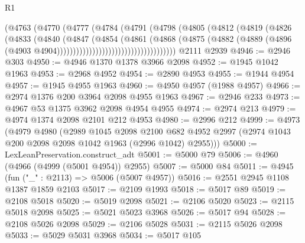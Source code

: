 \begin{lexlean}{R1}
\begin{coremodule}
                                    (@4763
                                      (@4770
                                        (@4777
                                          (@4784
                                            (@4791
                                              (@4798
                                                (@4805
                                                  (@4812
                                                    (@4819
                                                      (@4826
                                                        (@4833
                                                          (@4840
                                                            (@4847
                                                              (@4854
                                                                (@4861
                                                                  (@4868
                                                                    (@4875
                                                                      (@4882
                                                                        (@4889
                                                                          (@4896
                                                                            (@4903
                                                                              @4904)))))))))))))))))))))))))))))))))))))
    @2111
    @2939
@4946 := @2946 @303
@4950 := @4946 @1370 @1378 @3966 @2098
@4952 := @1945 @1042 @1963
@4953 := @2968 @4952
@4954 := @2890 @4953
@4955 := @1944 @4954
@4957 := @1945 @4955 @1963
@4960 := @4950 @4957 (@1988 @4957)
@4966 := @2974 @1376 @200 @3964 @2098 @4955 @1963
@4967 := @2946 @233
@4973 := @4967 @53 @1375 @3962 @2098 @4954 @4955
@4974 := @2974 @213
@4979 := @4974 @1374 @2098 @2101 @212 @4953
@4980 := @2996 @212
@4999 := @4973
    (@4979
      @4980
      (@2989
        @1045
        @2098
        @2100
        @682
        @4952
        @2997
        (@2974 @1043 @200 @2098 @2098 @1042 @1963 (@2996 @1042) @2955)))
@5000 := LexLeanPreservation.construct_adt
@5001 := @5000 @79
@5006 := @4960 (@4966 (@4999 (@5001 @4954)) @2955)
@5007 := @5000 @84
@5011 := @4945 (fun ("_" : @2113) => @5006 (@5007 @4957))
@5016 := @2551 @2945 @1108 @1387 @1859 @2103
@5017 := @2109 @1993
@5018 := @5017 @89
@5019 := @2108 @5018
@5020 := @5019 @2098
@5021 := @2106 @5020
@5023 := @2115 @5018 @2098
@5025 := @5021 @5023 @3968
@5026 := @5017 @94
@5028 := @2108 @5026 @2098
@5029 := @2106 @5028
@5031 := @2115 @5026 @2098
@5033 := @5029 @5031 @3968
@5034 := @5017 @105

\end{coremodule}
\end{lexlean}
